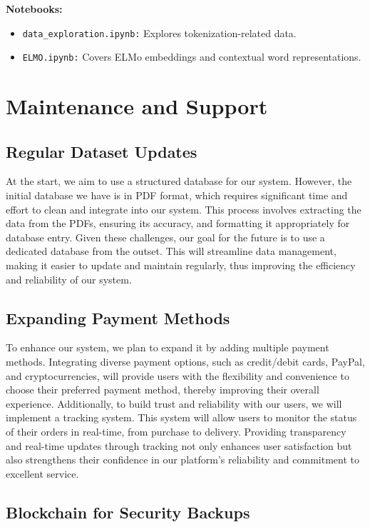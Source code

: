 \documentclass{article}
\begin{document}
\textbf{Notebooks:}
\begin{itemize}
    \item \texttt{data\_exploration.ipynb:} Explores tokenization-related data.
    \item \texttt{ELMO.ipynb:} Covers ELMo embeddings and contextual word representations.
\end{itemize}


\section{Maintenance and Support}

\subsection{Regular Dataset Updates}

At the start, we aim to use a structured database for our system. However, the initial database we have is in PDF format, which requires significant time and effort to clean and integrate into our system. This process involves extracting the data from the PDFs, ensuring its accuracy, and formatting it appropriately for database entry. Given these challenges, our goal for the future is to use a dedicated database from the outset. This will streamline data management, making it easier to update and maintain regularly, thus improving the efficiency and reliability of our system.

\subsection{Expanding Payment Methods}

To enhance our system, we plan to expand it by adding multiple payment methods. Integrating diverse payment options, such as credit/debit cards, PayPal, and cryptocurrencies, will provide users with the flexibility and convenience to choose their preferred payment method, thereby improving their overall experience. Additionally, to build trust and reliability with our users, we will implement a tracking system. This system will allow users to monitor the status of their orders in real-time, from purchase to delivery. Providing transparency and real-time updates through tracking not only enhances user satisfaction but also strengthens their confidence in our platform's reliability and commitment to excellent service.

\subsection{Blockchain for Security Backups}
\end{document}

